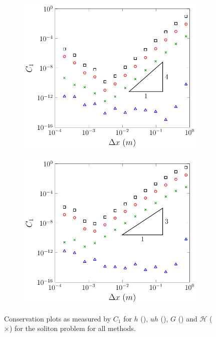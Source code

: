 \begin{figure}
\begin{subfigure}{0.5\textwidth}
		\vspace{0.3cm}
	\end{subfigure}
	\begin{subfigure}{0.5\textwidth}
		\includegraphics[width=\textwidth]{./chp5/figures/Analytic/Soliton/C1/D.pdf}
		\vspace{0.3cm}
	\end{subfigure}%
	\begin{subfigure}{0.5\textwidth}
		\includegraphics[width=\textwidth]{./chp5/figures/Analytic/Soliton/C1/W.pdf}
		\vspace{0.3cm}
	\end{subfigure}
	\caption{Conservation plots as measured by $C_1$ for $h$ (), $uh$ (), $G$ () and $\mathcal{H}$ ({\color{green!60!black} $\times$}) for the soliton problem for all methods.}
	\label{fig:SolitonC1All}
\end{figure}


